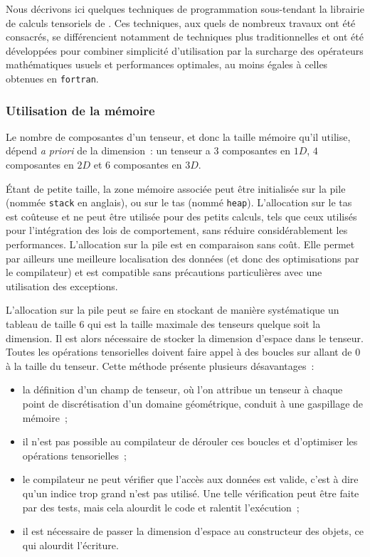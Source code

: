 \documentclass[rectoverso,pleiades,pstricks,leqno,anti]{texmf/note_technique_2010}
\newcommand{\fortran}{\texttt{fortran}}
\newcommand{\tfel}[1]{\index{tfel}{#1}{\texttt{#1}}}
\begin{document}
Nous décrivons ici quelques techniques de programmation sous-tendant
la librairie de calculs tensoriels de \tfel{}. Ces techniques, aux
quels de nombreux travaux ont été consacrés, se différencient
notamment de techniques plus traditionnelles et ont été développées
pour combiner simplicité d'utilisation par la surcharge des opérateurs
mathématiques usuels et performances optimales, au moins égales à
celles obtenues en \fortran{}.

\subsubsection{Utilisation de la mémoire}

Le nombre de composantes d'un tenseur, et donc la taille mémoire qu'il
utilise, dépend {\em a priori} de la dimension~: un tenseur a \(3\)
composantes en \(1D\), \(4\) composantes en \(2D\) et \(6\)
composantes en \(3D\).

Étant de petite taille, la zone mémoire associée peut être initialisée
sur la pile (nommée \texttt{stack} en anglais), ou sur le tas (nommé
\texttt{heap}). L'allocation sur le tas est coûteuse et ne peut être
utilisée pour des petits calculs, tels que ceux utilisés pour
l'intégration des lois de comportement, sans réduire considérablement
les performances. L'allocation sur la pile est en comparaison sans
coût. Elle permet par ailleurs une meilleure localisation des données
(et donc des optimisations par le compilateur) et est compatible sans
précautions particulières avec une utilisation des exceptions.

L'allocation sur la pile peut se faire en stockant de manière
systématique un tableau de taille \(6\) qui est la taille maximale des
tenseurs quelque soit la dimension. Il est alors nécessaire de stocker
la dimension d'espace dans le tenseur. Toutes les opérations
tensorielles doivent faire appel à des boucles sur allant de \(0\) à la
taille du tenseur. Cette méthode présente plusieurs désavantages~:
\begin{itemize}
  \item la définition d'un champ de tenseur, où l'on attribue un tenseur
  à chaque point de discrétisation d'un domaine géométrique, conduit à
  une gaspillage de mémoire~;
  \item il n'est pas possible au compilateur de dérouler ces boucles et
  d'optimiser les opérations tensorielles~;
  \item le compilateur ne peut vérifier que l'accès aux données est
  valide, c'est à dire qu'un indice trop grand n'est pas utilisé. Une
  telle vérification peut être faite par des tests, mais cela alourdit
  le code et ralentit l'exécution~;
  \item il est nécessaire de passer la dimension d'espace au
  constructeur des objets, ce qui alourdit l'écriture.
\end{itemize}
\end{document}
